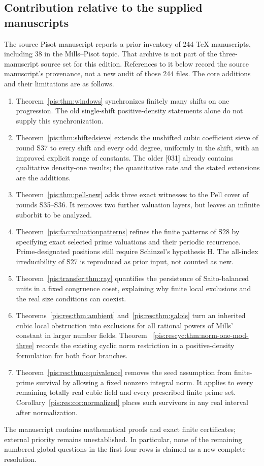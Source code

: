 \documentclass[11pt,a4paper]{article}
\theoremstyle{definition}\newtheorem{definition}[theorem]{Definition}
\theoremstyle{remark}\newtheorem{remark}[theorem]{Remark}
\begin{document}
\subsection{Contribution relative to the supplied manuscripts}
The source Pisot manuscript reports a prior inventory of 244 TeX
manuscripts, including 38 in the Mills--Pisot topic. That archive is not
part of the three-manuscript source set for this edition. References to
it below record the source manuscript's provenance, not a new audit of
those 244 files.
The core additions and their limitations are as follows.
\begin{enumerate}
\item Theorem~\ref{pis:thm:windows} synchronizes finitely many shifts on
one progression. The old single-shift positive-density statements
alone do not supply this synchronization.
\item Theorem~\ref{pis:thm:shiftedsieve} extends the unshifted cubic
coefficient sieve of round S37 to every shift and every odd degree,
uniformly in the shift, with an improved explicit range of constants.
The older [031] already contains qualitative density-one results;
the quantitative rate and the stated extensions are the additions.
\item Theorem~\ref{pis:thm:pell-new} adds three exact witnesses to the
Pell cover of rounds S35--S36. It removes two further valuation
layers, but leaves an infinite suborbit to be analyzed.
\item Theorem~\ref{pis:fac:valuationpatterns} refines the finite patterns
of S28 by specifying exact selected prime valuations and their
periodic recurrence. Prime-designated positions still require
Schinzel's hypothesis H. The all-index irreducibility of S27 is
reproduced as prior input, not counted as new.
\item Theorem~\ref{pis:transfer:thm:ray} quantifies the persistence of
Saito-balanced units in a fixed congruence coset, explaining why
finite local exclusions and the real size conditions can coexist.
\item Theorems~\ref{pis:res:thm:ambient} and~\ref{pis:res:thm:galois} turn
an inherited cubic local obstruction into exclusions for all rational
powers of Mills' constant in larger number fields. Theorem~
\ref{pis:rescyc:thm:norm-one-mod-three} records the existing cyclic
norm restriction in a positive-density formulation for both floor branches.
\item Theorem~\ref{pis:res:thm:equivalence} removes the seed assumption
from finite-prime survival by allowing a fixed nonzero integral norm.
It applies to every remaining totally real cubic field and every
prescribed finite prime set. Corollary~\ref{pis:res:cor:normalized}
places such survivors in any real interval after normalization.
\end{enumerate}
The manuscript contains mathematical proofs and exact finite
certificates; external priority remains unestablished. In particular,
none of the remaining numbered global questions in the first four
rows is claimed as a new complete resolution.
\end{document}
